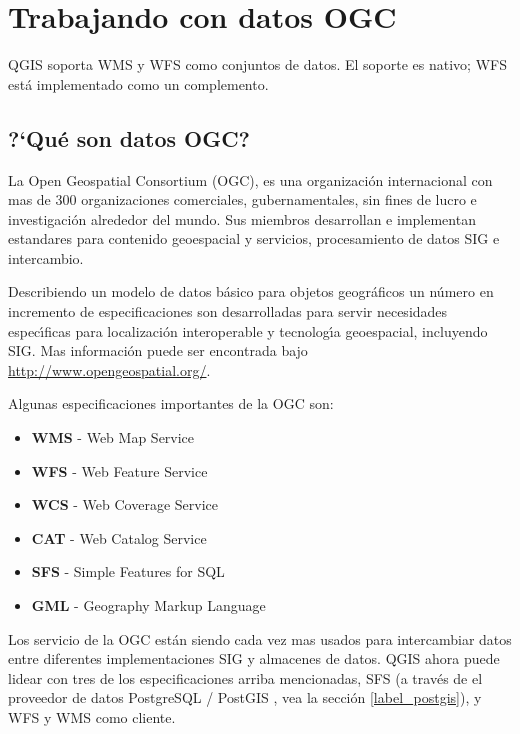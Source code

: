 
\section{Trabajando con datos OGC}


QGIS soporta WMS y WFS como conjuntos de datos. El soporte es nativo; WFS est\'a
implementado como un complemento.

\subsection{?`Qu\'e son datos OGC?}

La Open Geospatial Consortium (OGC), es una organizaci\'on internacional con mas de 300 
organizaciones comerciales, gubernamentales, sin fines de lucro e investigaci\'on  alrededor del mundo. Sus miembros 
desarrollan e implementan estandares para contenido geoespacial y servicios, procesamiento de datos SIG 
e intercambio.

Describiendo un modelo de datos b\'asico para objetos geogr\'aficos un n\'umero en incremento de especificaciones 
son desarrolladas para servir necesidades espec\'{\i}ficas para localizaci\'on interoperable y tecnolog\'{\i}a geoespacial, 
incluyendo SIG. Mas informaci\'on puede ser encontrada bajo \url{http://www.opengeospatial.org/}.

Algunas especificaciones importantes de la OGC son:

\begin{itemize}
\item \textbf{WMS} - Web Map Service
\item \textbf{WFS} - Web Feature Service
\item \textbf{WCS} - Web Coverage Service
\item \textbf{CAT} - Web Catalog Service
\item \textbf{SFS} - Simple Features for SQL
\item \textbf{GML} - Geography Markup Language
\end{itemize}

Los servicio de la OGC est\'an siendo cada vez mas usados para intercambiar datos entre
diferentes implementaciones SIG y almacenes de datos.  QGIS ahora puede lidear con tres de los
especificaciones arriba mencionadas, SFS (a trav\'es de el proveedor de datos PostgreSQL / PostGIS
, vea la secci\'on \ref{label_postgis}), y WFS y WMS como cliente.

